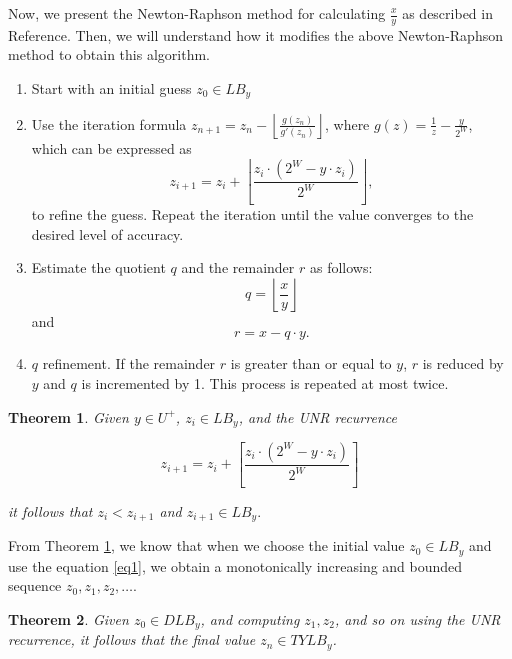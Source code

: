 \documentclass[12pt]{elsarticle}
\newtheorem{theorem}{Theorem}
\begin{document}
Now, we present the Newton-Raphson method for calculating $\frac{x}{y}$ as described in Reference\cite{rodeheffer2008software}. Then, we will understand how it modifies the above Newton-Raphson method to obtain this algorithm.


\begin{enumerate}
    \item Start with an initial guess \( z_0 \in LB_y \)
    \item Use the iteration formula \( z_{n+1} = z_n - \left\lfloor \frac{g(z_n)}{g'(z_n)} \right\rfloor \), where \( g(z) = \frac{1}{z} - \frac{y}{2^W} \), which can be expressed as 
    \begin{equation}\label{eq1}
        z_{i+1} = z_{i} + \left \lfloor \frac{z_{i} \cdot (2^{W} - y \cdot z_{i})}{2^{W}} \right \rfloor,  
    \end{equation}
    to refine the guess. Repeat the iteration until the value converges to the desired level of accuracy.
    
    \item Estimate the quotient \( q \) and the remainder \( r \) as follows: 
    \[
    q = \left\lfloor \frac{x}{y} \right\rfloor
    \]
    and 
    \[
    r = x - q \cdot y.
    \]
    
    \item \( q \) refinement. If the remainder \( r \) is greater than or equal to \( y \), \( r \) is reduced by \( y \) and \( q \) is incremented by 1. This process is repeated at most twice.

\end{enumerate}


\begin{theorem}\cite{rodeheffer2008software}\label{thm1}
    Given \( y \in U^{+} \), \( z_{i} \in LB_{y} \), and the UNR recurrence

    \[ z_{i+1} = z_{i} + \left[ \frac{z_{i} \cdot (2^{W} - y \cdot z_{i})}{2^{W}} \right] \]
    
    it follows that \( z_{i} < z_{i+1} \) and \( z_{i+1} \in LB_{y}. \) 
\end{theorem}

From Theorem \ref{thm1}, we know that when we choose the initial value \( z_0 \in LB_y \) and use the equation \ref{eq1},
we obtain a monotonically increasing and bounded sequence \( z_0, z_1, z_2, \ldots \).

\begin{theorem}\cite{rodeheffer2008software}\label{thm2}
        Given \( z_0 \in DLB_y \), and computing \( z_1, z_2 \), and so on using the UNR recurrence, it follows that the final value \( z_n \in TYLB_y \).
\end{theorem}
\end{document}
